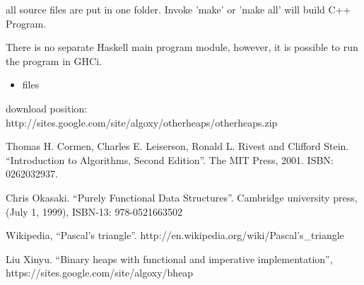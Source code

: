 \documentclass{article}
\begin{document}
all source files are put in one folder. Invoke 'make' or 'make all'
will build C++ Program. 

There is no separate Haskell main program module, however, it is possible to run the program in GHCi.

\begin{itemize}
\item files

\end{itemize}

download position: http://sites.google.com/site/algoxy/otherheaps/otherheaps.zip

\begin{thebibliography}{99}

Thomas H. Cormen, Charles E. Leiserson, Ronald L. Rivest and Clifford Stein. ``Introduction to Algorithms, Second Edition''. The MIT Press, 2001. ISBN: 0262032937.

Chris Okasaki. ``Purely Functional Data Structures''. Cambridge university press, (July 1, 1999), ISBN-13: 978-0521663502

Wikipedia, ``Pascal's triangle''. http://en.wikipedia.org/wiki/Pascal's\_triangle

Liu Xinyu. ``Binary heaps with functional and imperative implementation'', https://sites.google.com/site/algoxy/bheap

\end{thebibliography}

\ifx\wholebook\relax \else
\end{document}
